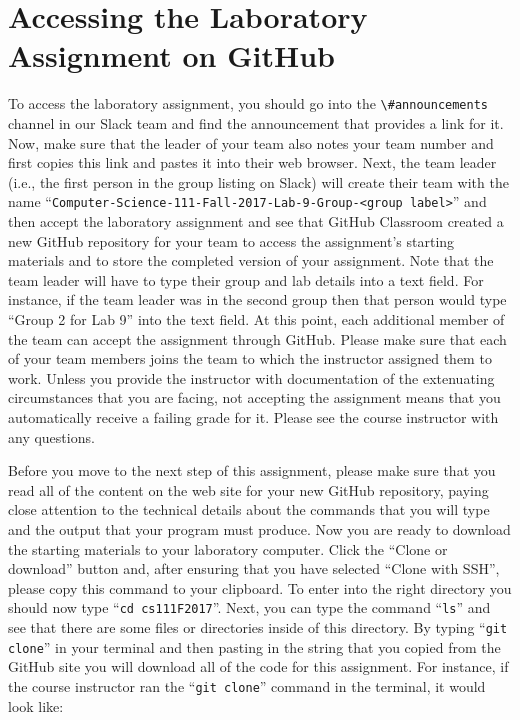 \documentclass[11pt]{article}
\newcommand{\command}[1]{``\lstinline{#1}''}
\newcommand{\channel}[1]{\lstinline{#1}}
\begin{document}
\section*{Accessing the Laboratory Assignment on GitHub}

To access the laboratory assignment, you should go into the \channel{\#announcements} channel in our Slack team and find
the announcement that provides a link for it. Now, make sure that the leader of your team also notes your team number
and first copies this link and pastes it into their web browser. Next, the team leader (i.e., the first person in the
group listing on Slack) will create their team with the name \command{Computer-Science-111-Fall-2017-Lab-9-Group-<group
label>} and then accept the laboratory assignment and see that GitHub Classroom created a new GitHub repository for
your team to access the assignment's starting materials and to store the completed version of your assignment. Note that
the team leader will have to type their group and lab details into a text field. For instance, if the team leader was in
the second group then that person would type ``Group 2 for Lab 9'' into the text field. At this point, each additional
member of the team can accept the assignment through GitHub. Please make sure that each of your team members joins the
team to which the instructor assigned them to work. Unless you provide the instructor with documentation of the
extenuating circumstances that you are facing, not accepting the assignment means that you automatically receive a
failing grade for it. Please see the course instructor with any questions.

Before you move to the next step of this assignment, please make sure that you read all of the content on the web site
for your new GitHub repository, paying close attention to the technical details about the commands that you will type
and the output that your program must produce. Now you are ready to download the starting materials to your laboratory
computer. Click the ``Clone or download'' button and, after ensuring that you have selected ``Clone with SSH'', please
copy this command to your clipboard. To enter into the right directory you should now type \command{cd cs111F2017}.
Next, you can type the command \command{ls} and see that there are some files or directories inside of this directory.
By typing \command{git clone} in your terminal and then pasting in the string that you copied from the GitHub site you
will download all of the code for this assignment. For instance, if the course instructor ran the \command{git clone}
command in the terminal, it would look like:
\end{document}
